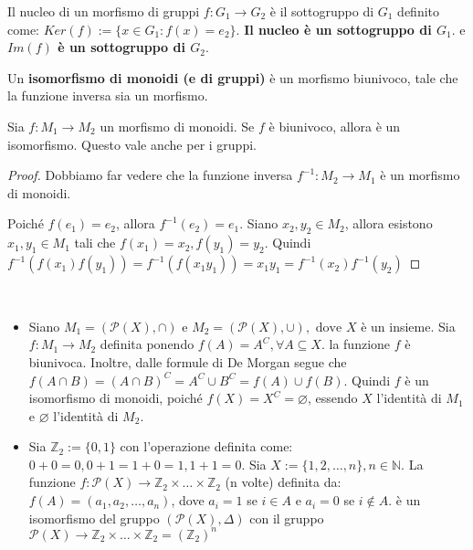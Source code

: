 \documentclass[../main.tex]{subfiles}
\begin{document}
\begin{remark}
    Il nucleo di un morfismo di gruppi $f: G_1 \rightarrow G_2$ è il sottogruppo di $G_1$ definito come: $Ker(f):= \{x \in G_1 : f(x) = e_2\}$.
    \textbf{Il nucleo è un sottogruppo di $G_1$}. e \textbf{$Im(f)$ è un sottogruppo di $G_2$}.
\end{remark}

\begin{definition}[Isomorfismo]
    Un \textbf{isomorfismo di monoidi (e di gruppi)} è un morfismo biunivoco, tale che la funzione inversa sia un morfismo.
\end{definition}

\begin{proposition}
    Sia $f: M_1 \rightarrow M_2$ un morfismo di monoidi. Se $f$ è biunivoco, allora è un isomorfismo. Questo vale anche per i gruppi.
\end{proposition}

\begin{proof}
    Dobbiamo far vedere che la funzione inversa $f^{-1} : M_2 \rightarrow M_1$ è un morfismo di monoidi.

    Poiché $f(e_1) = e_2$, allora $f^{-1}(e_2) = e_1$.
    Siano $x_2,y_2 \in M_2$, allora esistono $x_1,y_1 \in M_1$ tali che $f(x_1)= x_2 , f(y_1)=y_2$.
    Quindi $f^{-1} (f(x_1)f(y_1)) = f^{-1}(f(x_1 y_1)) = x_1 y_1 = f^{-1}(x_2) f^{-1}(y_2)$
\end{proof}

\begin{example}
    \
    \begin{itemize}
        \item Siano $M_1 = (\mathcal{P}(X), \cap) \text{ e } M_2 = (\mathcal{P}(X), \cup), \text{ dove } X$
              è un insieme. Sia $f : M_1 \rightarrow M_2$ definita ponendo $f(A) = A^C , \forall A \subseteq X$.
              la funzione $f$ è biunivoca. Inoltre, dalle formule di De Morgan segue che $f(A \cap B) =
                  (A \cap B)^C = A^C \cup B^C = f(A) \cup f(B)$. Quindi $f$ è un isomorfismo di monoidi, poiché
              $f(X) = X^C = \varnothing$, essendo $X$ l'identità di $M_1$ e $\varnothing$ l'identità di $M_2$.
        \item Sia $\mathbb{Z}_2 := \{0,1\}$ con l'operazione definita come: $0+0=0, 0+1=1+0=1, 1+1=0$.
              Sia $X := \{1,2,\ldots,n\}, n \in \mathbb{N}$. La funzione $f: \mathcal{P}(X) \rightarrow
                  \mathbb{Z}_2 \times \ldots \times \mathbb{Z}_2$ (n volte) definita da: $f(A) = (a_1,a_2,\ldots,a_n)$,
              dove $a_i = 1$ se $i \in A$ e $a_i = 0$ se $i \notin A$. \newline è un isomorfismo del gruppo
              $(\mathcal{P}(X), \Delta)$ con il gruppo $\mathcal{P}(X) \rightarrow \mathbb{Z}_2 \times \ldots
                  \times \mathbb{Z}_2 = (\mathbb{Z}_2)^n$
    \end{itemize}
\end{example}
\end{document}

